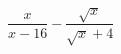 \begin{ex}[type=expression]
	\begin{condition}
		\( \dfrac{x}{x-16}-\dfrac{\sqrt{x}}{\sqrt{x}+4} \)
	\end{condition}
\end{ex}